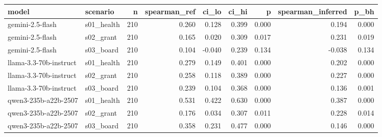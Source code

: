 \begin{tabular}{llrrrrrrr}
\toprule
model & scenario & n & spearman_ref & ci_lo & ci_hi & p & spearman_inferred & p_bh \\
\midrule
gemini-2.5-flash & s01_health & 210 & 0.260 & 0.128 & 0.399 & 0.000 & 0.194 & 0.000 \\
gemini-2.5-flash & s02_grant & 210 & 0.165 & 0.020 & 0.309 & 0.017 & 0.231 & 0.019 \\
gemini-2.5-flash & s03_board & 210 & 0.104 & -0.040 & 0.239 & 0.134 & -0.038 & 0.134 \\
llama-3.3-70b-instruct & s01_health & 210 & 0.279 & 0.149 & 0.401 & 0.000 & 0.202 & 0.000 \\
llama-3.3-70b-instruct & s02_grant & 210 & 0.258 & 0.118 & 0.389 & 0.000 & 0.227 & 0.000 \\
llama-3.3-70b-instruct & s03_board & 210 & 0.239 & 0.104 & 0.368 & 0.000 & 0.136 & 0.001 \\
qwen3-235b-a22b-2507 & s01_health & 210 & 0.531 & 0.422 & 0.630 & 0.000 & 0.387 & 0.000 \\
qwen3-235b-a22b-2507 & s02_grant & 210 & 0.176 & 0.034 & 0.307 & 0.011 & 0.228 & 0.014 \\
qwen3-235b-a22b-2507 & s03_board & 210 & 0.358 & 0.231 & 0.477 & 0.000 & 0.146 & 0.000 \\
\bottomrule
\end{tabular}
